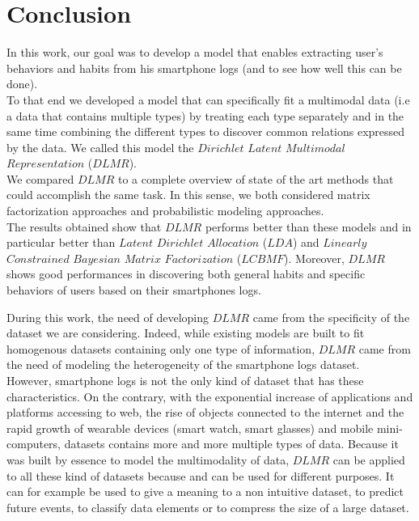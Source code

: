 
\chapter{Conclusion} %

\label{Chapter7} %


In this work, our goal was to develop a model that enables extracting user's behaviors and habits from his smartphone logs (and to see how well this can be done).
\\To that end we developed a model that can specifically fit a multimodal data (i.e a data that contains multiple types) by treating each type separately and in the same time combining the different types to discover common relations expressed by the data. We called this model the $Dirichlet$ $Latent$ $Multimodal$ $Representation$ ($DLMR$).
\\We compared $DLMR$ to a complete overview of state of the art methods that could accomplish the same task. In this sense, we both considered matrix factorization approaches and probabilistic modeling approaches.
\\The results obtained show that $DLMR$ performs better than these models and in particular better than $Latent$ $Dirichlet$ $Allocation$ ($LDA$) and $Linearly$ $Constrained$ $Bayesian$ $Matrix$ $Factorization$ ($LCBMF$). Moreover, $DLMR$ shows good performances in discovering both general habits and specific behaviors of users based on their smartphones logs. \par

During this work, the need of developing $DLMR$ came from the specificity of the dataset we are considering. Indeed, while existing models are built to fit homogenous datasets containing only one type of information, $DLMR$ came from the need of modeling the heterogeneity of the smartphone logs dataset.
\\However, smartphone logs is not the only kind of dataset that has these characteristics. On the contrary, with the exponential increase of applications and platforms accessing to web, the rise of objects connected to the internet and the rapid growth of wearable devices (smart watch, smart glasses) and mobile mini-computers, datasets contains more and more multiple types of data. Because it was built by essence to model the multimodality of data, $DLMR$ can be applied to all these kind of datasets because and can be used for different purposes. It can for example be used to give a meaning to a non intuitive dataset, to predict future events, to classify data elements or to compress the size of a large dataset.

